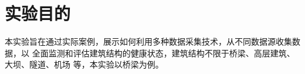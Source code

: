 \section{实验目的}
本实验旨在通过实际案例，展示如何利用多种数据采集技术，从不同数据源收集数据，以
全面监测和评估建筑结构的健康状态，建筑结构不限于桥梁、高层建筑、大坝、隧道、机场
等，本实验以桥梁为例。